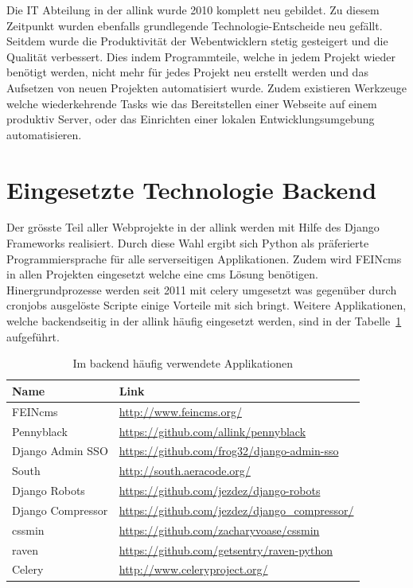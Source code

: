 
Die IT Abteilung in der allink wurde 2010 komplett neu gebildet. Zu diesem Zeitpunkt wurden ebenfalls grundlegende Technologie-Entscheide neu gefällt. Seitdem wurde die Produktivität der Webentwicklern stetig gesteigert und die Qualität verbessert. Dies indem Programmteile, welche in jedem Projekt wieder benötigt werden, nicht mehr für jedes Projekt neu erstellt werden und das Aufsetzen von neuen Projekten automatisiert wurde. Zudem existieren Werkzeuge welche wiederkehrende Tasks wie das Bereitstellen einer Webseite auf einem produktiv Server, oder das Einrichten einer lokalen Entwicklungsumgebung automatisieren.

\section{Eingesetzte Technologie Backend}
\label{sec:eingesetzte_technologie_backend}
Der grösste Teil aller Webprojekte in der allink werden mit Hilfe des Django Frameworks realisiert. Durch diese Wahl ergibt sich Python als präferierte Programmiersprache für alle serverseitigen Applikationen. Zudem wird FEINcms in allen Projekten eingesetzt welche eine cms Lösung benötigen. Hinergrundprozesse werden seit 2011 mit celery umgesetzt was gegenüber durch cronjobs ausgelöste Scripte einige Vorteile mit sich bringt. Weitere Applikationen, welche backendseitig in der allink häufig eingesetzt werden, sind in der Tabelle~\ref{tab:backend_applications} aufgeführt.

\begin{table}[ht]
  \centering
  \begin{tabular}{ll}
  \toprule
    Name & Link\\
  \midrule
    FEINcms & \url{http://www.feincms.org/}\\
  \midrule
    Pennyblack & \url{https://github.com/allink/pennyblack}\\
  \midrule
    Django Admin SSO & \url{https://github.com/frog32/django-admin-sso}\\
  \midrule
    South & \url{http://south.aeracode.org/}\\
  \midrule
    Django Robots & \url{https://github.com/jezdez/django-robots}\\
  \midrule
    Django Compressor & \url{https://github.com/jezdez/django_compressor/}\\
  \midrule
    cssmin & \url{https://github.com/zacharyvoase/cssmin}\\
  \midrule
    raven & \url{https://github.com/getsentry/raven-python}\\
  \midrule
    Celery & \url{http://www.celeryproject.org/}\\
  \bottomrule
  \end{tabular}
  \caption{Im backend häufig verwendete Applikationen}
  \label{tab:backend_applications}
\end{table}

